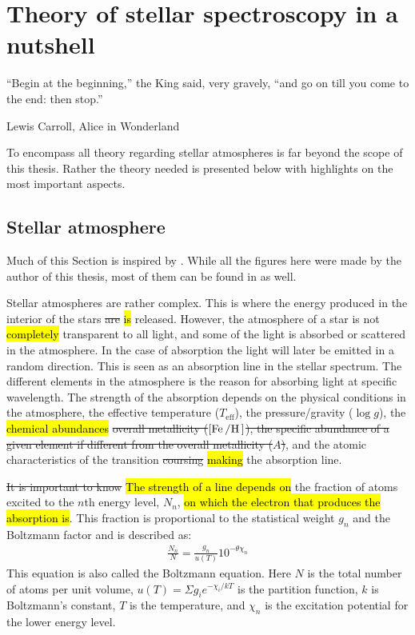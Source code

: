 \chapter{Theory of stellar spectroscopy in a nutshell}
\label{cha:theory}

\epigraph{``Begin at the beginning,'' the King said, very gravely, ``and go on till you come to the
          end: then stop.''}{Lewis Carroll, Alice in Wonderland}

To encompass all theory regarding stellar atmospheres is far beyond the scope of this thesis. Rather
the theory needed is presented below with highlights on the most important aspects.


\section{Stellar atmosphere}
\label{sec:stellar_atmosphere}

Much of this Section is inspired by \citet{Gray2006}. While all the figures here were made by the
author of this thesis, most of them can be found in \citet{Gray2006} as well.

Stellar atmospheres are rather complex. This is where the energy produced in the interior of the
stars \st{are} \hl{is} released. However, the atmosphere of a star is not \hl{completely}
transparent to all light, and some of the light is absorbed or scattered in the atmosphere. In the
case of absorption the light will later be emitted in a random direction. This is seen as an
absorption line in the stellar spectrum. The different elements in the atmosphere is the reason for
absorbing light at specific wavelength. The strength of the absorption depends on the physical
conditions in the atmosphere, the effective temperature ($T_\mathrm{eff}$), the pressure/gravity
($\log g$), the \hl{chemical abundances} \st{overall metallicity ($[\ion{Fe}/\ion{H}]$), the
specific abundance of a given element if different from the overall metallicity ($A$)}, and the
atomic characteristics of the transition \st{coursing} \hl{making} the absorption line.

\st{It is important to know} \hl{The strength of a line depends on} the fraction of atoms excited to
the $n$th energy level, $N_n$, \hl{on which the electron that produces the absorption is}. This
fraction is proportional to the statistical weight $g_n$ and the Boltzmann factor and is described
as:
\begin{align}
    \frac{N_n}{N} = \frac{g_n}{u(T)} 10^{-\theta\chi_n} \tag*{Boltzmann}\label{eq:boltzmann}
\end{align}
This equation is also called the Boltzmann equation. Here $N$ is the total number of atoms per unit
volume, $u(T)=\Sigma g_i e^{-\chi_i/kT}$ is the partition function, $k$ is Boltzmann's constant, $T$
is the temperature, and $\chi_n$ is the excitation potential for the lower energy level.

